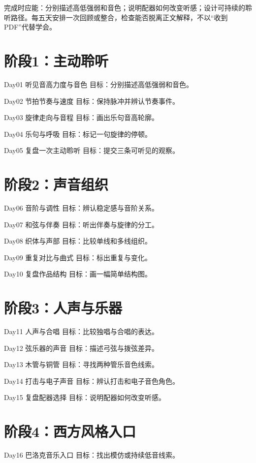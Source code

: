 \documentclass[11pt]{article}
\newcommand{\Needspace}[1]{\par\ifdim\dimexpr\pagegoal-\pagetotal\relax<#1\relax\newpage\fi}
\begin{document}
完成时应能：分别描述高低强弱和音色；说明配器如何改变听感；设计可持续的聆听路径。每五天安排一次回顾或整合，检查能否脱离正文解释，不以“收到PDF”代替学会。

\Needspace{5\baselineskip}\section*{阶段1：主动聆听}

Day01  听见音高力度与音色
目标：分别描述高低强弱和音色。

Day02  节拍节奏与速度
目标：保持脉冲并辨认节奏事件。

Day03  旋律走向与音程
目标：画出乐句音高轮廓。

Day04  乐句与呼吸
目标：标记一句旋律的停顿。

Day05  复盘一次主动聆听
目标：提交三条可听见的观察。

\Needspace{5\baselineskip}\section*{阶段2：声音组织}

Day06  音阶与调性
目标：辨认稳定感与音阶关系。

Day07  和弦与伴奏
目标：听出伴奏与旋律的分工。

Day08  织体与声部
目标：比较单线和多线组织。

Day09  重复对比与曲式
目标：标出重复与变化。

Day10  复盘作品结构
目标：画一幅简单结构图。

\Needspace{5\baselineskip}\section*{阶段3：人声与乐器}

Day11  人声与合唱
目标：比较独唱与合唱的表达。

Day12  弦乐器的声音
目标：描述弓弦与拨弦差异。

Day13  木管与铜管
目标：寻找两种管乐音色线索。

Day14  打击与电子声音
目标：辨认打击和电子音色角色。

Day15  复盘配器选择
目标：说明配器如何改变听感。

\Needspace{5\baselineskip}\section*{阶段4：西方风格入口}

Day16  巴洛克音乐入口
目标：找出模仿或持续低音线索。
\end{document}
